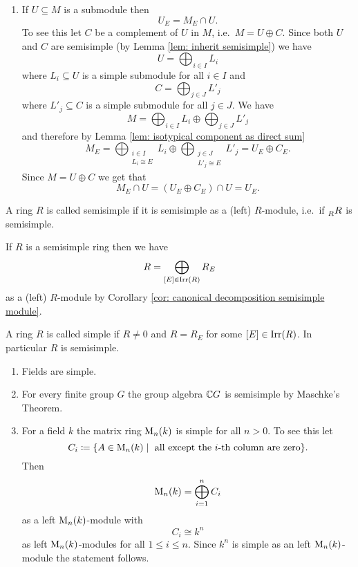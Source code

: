 \begin{rem}
\begin{enumerate}[label=\emph{\alph*})]
  \item
  If $U \subseteq M$ is a submodule then
  \[
   U_E = M_E \cap U.
  \]
  To see this let $C$ be a complement of $U$ in $M$, i.e.\ $M = U \oplus C$. Since both $U$ and $C$ are semisimple (by Lemma \ref{lem: inherit semisimple}) we have
  \[
   U = \bigoplus_{i \in I} L_i
  \]
  where $L_i \subseteq U$ is a simple submodule for all $i \in I$ and
  \[
   C = \bigoplus_{j \in J} L'_j
  \]
  where $L'_j \subseteq C$ is a simple submodule for all $j \in J$. We have
  \[
   M = \bigoplus_{i \in I} L_i \oplus \bigoplus_{j \in J} L'_j
  \]
  and therefore by Lemma \ref{lem: isotypical component as direct sum}
  \[
   M_E
   = \bigoplus_{\substack{i \in I \\ L_i \cong E}} L_i \oplus \bigoplus_{\substack{j \in J \\ L'_j \cong E}} L'_j
   = U_E \oplus C_E.
  \]
  Since $M = U \oplus C$ we get that
  \[
   M_E \cap U = (U_E \oplus C_E) \cap U = U_E.
  \]
 \end{enumerate}
\end{rem}


\begin{defi}
 A ring $R$ is called semisimple if it is semisimple as a (left) $R$-module, i.e.\ if $\prescript{}{R}{R}$ is semisimple.
\end{defi}


If $R$ is a semisimple ring then we have
\[
 R = \bigoplus_{[E] \in \operatorname{Irr}(R)} R_E
\]
as a (left) $R$-module by Corollary \ref{cor: canonical decomposition semisimple module}.


\begin{defi}
 A ring $R$ is called simple if $R \neq 0$ and $R = R_E$ for some \mbox{$[E] \in \operatorname{Irr}(R)$}. In particular $R$ is semisimple.
\end{defi}


\begin{expls}
 \begin{enumerate}[label=\emph{\alph*})]
  \item
  Fields are simple.
  \item
  For every finite group $G$ the group algebra $\mathbb{C} G$ is semisimple by Maschke’s Theorem.
  \item
  For a field $k$ the matrix ring $\operatorname{M}_n(k)$ is simple for all $n > 0$. To see this let
  \[
   C_i
   \coloneqq \{ A \in \operatorname{M}_n(k) \mid \text{ all except the $i$-th column are zero} \}.
  \]
  Then
  \[
   \operatorname{M}_n(k) = \bigoplus_{i=1}^n C_i
  \]
  as a left $\operatorname{M}_n(k)$-module with
  \[
   C_i \cong k^n
  \]
  as left $\operatorname{M}_n(k)$-modules for all $1 \leq i \leq n$. Since $k^n$ is simple as an left \mbox{$\operatorname{M}_n(k)$-module} the statement follows.
 \end{enumerate}
\end{expls}


